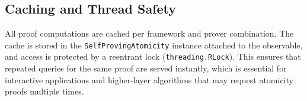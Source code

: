 \subsection{Caching and Thread Safety}

All proof computations are cached per framework and prover combination. The cache is stored in the \texttt{SelfProvingAtomicity} instance attached to the observable, and access is protected by a reentrant lock (\texttt{threading.RLock}). This ensures that repeated queries for the same proof are served instantly, which is essential for interactive applications and higher-layer algorithms that may request atomicity proofs multiple times.